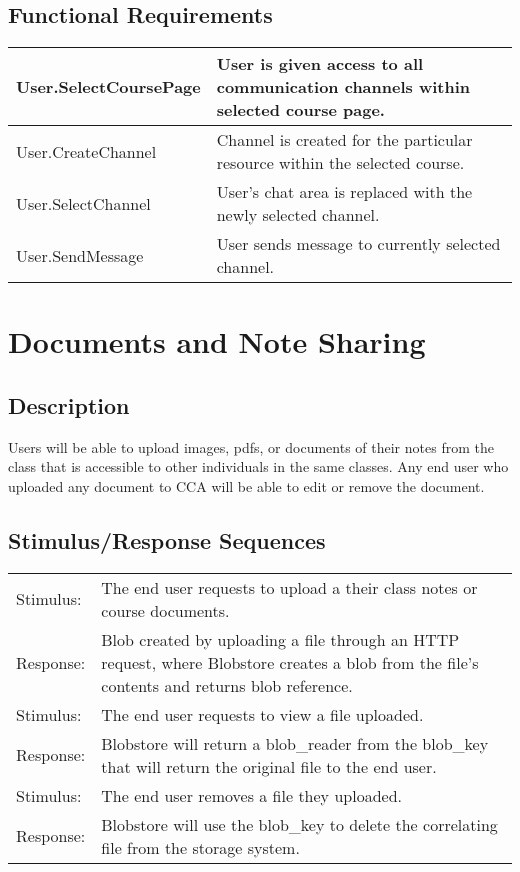 \documentclass{scrreprt}
\begin{document}
\subsection{Functional Requirements}
\begin{tabular}{| p{4cm} | p{10cm} |}
\hline
User.SelectCoursePage & User is given access to all communication channels within selected course page. \\ \hline
User.CreateChannel & Channel is created for the particular resource within the selected course. \\ \hline
User.SelectChannel  & User’s chat area is replaced with the newly selected channel. \\ \hline
User.SendMessage & User sends message to currently selected channel. \\
\hline
\end{tabular}


\section{Documents and Note Sharing}
\subsection{Description}
Users will be able to upload images, pdfs, or documents of their notes from the class that is accessible to other individuals in the same classes. Any end user who uploaded any document to CCA will be able to edit or remove the document. 
\subsection{Stimulus/Response Sequences}
\begin{tabular}{| p{2cm} | p{12cm} | }
	\hline
	Stimulus: & The end user requests to upload a their class notes or course documents. \\
	Response: & Blob created by uploading a file through an HTTP request, where Blobstore creates a blob from the file’s contents and returns blob reference. \\ \hline
	Stimulus: & The end user requests to view a file uploaded. \\
	Response: & Blobstore will return a blob_reader from the blob_key that will return the original file to the end user. \\ \hline
	Stimulus: & The end user removes a file they uploaded.\\
	Response: & Blobstore will use the blob_key to delete the correlating file from the storage system.\\
	\hline

\end{tabular}
\end{document}
